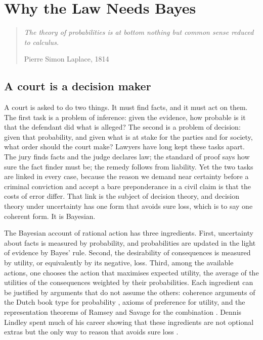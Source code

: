 \chapter{Why the Law Needs Bayes}
\label{ch:why}

\begin{quote}\itshape
The theory of probabilities is at bottom nothing but common sense reduced to calculus.
\par\hfill\normalfont Pierre Simon Laplace, 1814
\end{quote}

\section{A court is a decision maker}

A court is asked to do two things. It must find facts, and it must act on them. The first task is a problem of inference: given the evidence, how probable is it that the defendant did what is alleged? The second is a problem of decision: given that probability, and given what is at stake for the parties and for society, what order should the court make? Lawyers have long kept these tasks apart. The jury finds facts and the judge declares law; the standard of proof says how sure the fact finder must be; the remedy follows from liability. Yet the two tasks are linked in every case, because the reason we demand near certainty before a criminal conviction and accept a bare preponderance in a civil claim is that the costs of error differ. That link is the subject of decision theory, and decision theory under uncertainty has one form that avoids sure loss, which is to say one coherent form. It is Bayesian.

The Bayesian account of rational action has three ingredients. First, uncertainty about facts is measured by probability, and probabilities are updated in the light of evidence by Bayes' rule. Second, the desirability of consequences is measured by utility, or equivalently by its negative, loss. Third, among the available actions, one chooses the action that maximises expected utility, the average of the utilities of the consequences weighted by their probabilities. Each ingredient can be justified by arguments that do not assume the others: coherence arguments of the Dutch book type for probability \citep{definetti1974}, axioms of preference for utility, and the representation theorems of Ramsey and Savage for the combination \citep{savage1954}. Dennis Lindley spent much of his career showing that these ingredients are not optional extras but the only way to reason that avoids sure loss \citep{lindley1985,lindley2006}.

